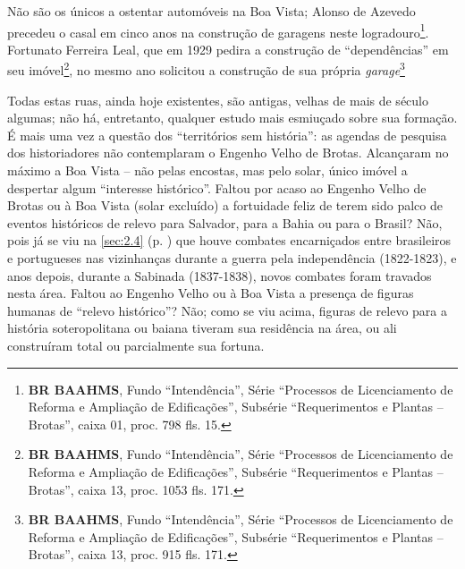 Não são os únicos a ostentar automóveis na Boa Vista; Alonso de Azevedo precedeu o casal em cinco anos na construção de garagens neste logradouro\footnote{\textbf{BR BAAHMS}, Fundo ``Intendência'', Série ``Processos de Licenciamento de Reforma e Ampliação de Edificações'', Subsérie ``Requerimentos e Plantas -- Brotas'', caixa 01, proc. 798 fls. 15.}. Fortunato Ferreira Leal, que em 1929 pedira a construção de ``dependências'' em seu imóvel\footnote{\textbf{BR BAAHMS}, Fundo ``Intendência'', Série ``Processos de Licenciamento de Reforma e Ampliação de Edificações'', Subsérie ``Requerimentos e Plantas -- Brotas'', caixa 13, proc. 1053 fls. 171.}, no mesmo ano solicitou a construção de sua própria \textit{garage}\footnote{\textbf{BR BAAHMS}, Fundo ``Intendência'', Série ``Processos de Licenciamento de Reforma e Ampliação de Edificações'', Subsérie ``Requerimentos e Plantas -- Brotas'', caixa 13, proc. 915 fls. 171.}


Todas estas ruas, ainda hoje existentes, são antigas, velhas de mais de século algumas; não há, entretanto, qualquer estudo mais esmiuçado sobre sua formação. É mais uma vez a questão dos ``territórios sem história'': as agendas de pesquisa dos historiadores não contemplaram o Engenho Velho de Brotas. Alcançaram no máximo a Boa Vista -- não pelas encostas, mas pelo solar, único imóvel a despertar algum ``interesse histórico''. Faltou por acaso ao Engenho Velho de Brotas ou à Boa Vista (solar excluído) a fortuidade feliz de terem sido palco de eventos históricos de relevo para Salvador, para a Bahia ou para o Brasil? Não, pois já se viu na \autoref{sec:2.4} (p. \pageref{sec:2.4}) que houve combates encarniçados entre brasileiros e portugueses nas vizinhanças durante a guerra pela independência (1822-1823), e anos depois, durante a Sabinada (1837-1838), novos combates foram travados nesta área. Faltou ao Engenho Velho ou à Boa Vista a presença de figuras humanas de ``relevo histórico''? Não; como se viu acima, figuras de relevo para a história soteropolitana ou baiana tiveram sua residência na área, ou ali construíram total ou parcialmente sua fortuna.

